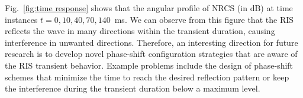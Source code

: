 Fig.~\ref{fig:time response} shows that the angular profile of \gls{NRCS} (in dB) at time instances $t=0,10,40,70,140$~ms. We can observe from this figure that the \gls{RIS} reflects the wave in many directions within the transient duration, causing interference in unwanted directions. Therefore, an interesting  direction for future research is to develop novel phase-shift configuration strategies that are aware of the \gls{RIS} transient behavior. Example problems include the design of phase-shift schemes that minimize the time to reach the desired reflection pattern or keep the interference during the transient duration below a maximum level.   


